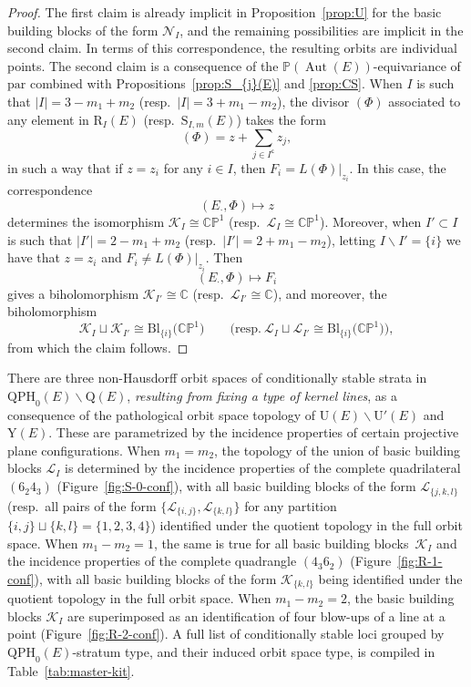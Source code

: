 \documentclass[10pt,a4paper]{amsart}
\newcommand{\field}[1]{\ensuremath{\mathbb{#1}}}
\newcommand{\CC}{\field{C}}
\newcommand{\PP}{\field{P}}
\newcommand{\curly}[1]{\mathscr{#1}}
\newcommand{\cK}{\curly{K}}
\newcommand{\cL}{\curly{L}}
\newcommand{\cN}{\curly{N}}
\newcommand{\qp}{\boldsymbol{\cdot}}
\DeclareMathOperator{\Aut}{Aut}
\numberwithin{equation}{section}
\begin{document}
\begin{proof}
The first claim is already implicit in Proposition~\ref{prop:U} for the basic building blocks of the form $\cN_{I}$, and the remaining possibilities are implicit in the second claim. In terms of this correspondence, the resulting orbits are individual points.
The second claim is a consequence of the $\PP(\Aut(E))$-equivariance of $\mathrm{par}$ combined with Propositions~\ref{prop:S_{j}(E)} and \ref{prop:CS}. When $I$ is such that $\vert I\vert = 3 - m_{1} + m_{2}$ (resp.~$\vert I\vert = 3 + m_{1} - m_{2}$), the divisor $(\Phi)$ associated to any element in $\mathrm{R}_{I}(E)$ (resp.~$\mathrm{S}_{I,m}(E)$) takes the form
\[
(\Phi) = z+ \sum_{j\in I^{\mathsf{c}}} z_{j},
\]
in such a way that if $z=z_{i}$ for any $i\in I$, then $F_{i} = L(\Phi)\vert_{z_{i}}$. In this case, the correspondence
\[
(E_{\qp},\Phi)\mapsto z
\]
determines the isomorphism $\cK_{I}\cong\CC\PP^{1}$ (resp.~$\cL_{I}\cong \CC\PP^{1}$). Moreover, when $I'\subset I$ is such that $\vert I'\vert = 2 - m_{1} + m_{2}$ (resp.~$\vert I'\vert = 2 + m_{1} - m_{2}$), letting $I\backslash I' = \{i\}$ we have that $z =z_{i}$ and $F_{i} \neq L(\Phi)\vert_{z_{i}}$. Then
\[
(E_{\qp},\Phi)\mapsto F_{i}
\]
gives a biholomorphism $\cK_{I'}\cong\CC$ (resp.~$\cL_{I'}\cong \CC$), and moreover, the biholomorphism
\[
\cK_{I}\sqcup\cK_{I'}\cong\mathrm{Bl}_{\{i\}}\big(\CC\PP^{1}\big)\qquad \big(\text{resp.}\ \cL_{I}\sqcup\cL_{I'}\cong\mathrm{Bl}_{\{i\}}\big(\CC\PP^{1}\big)\big),
\]
from which the claim follows.
\end{proof}

There are three non-Hausdorff orbit spaces of conditionally stable strata in $\mathrm{QPH}_{0}(E)\backslash\mathrm{Q}(E)$, \textit{resulting from fixing a type of kernel lines}, as a consequence of the pathological orbit space topology of $\mathrm{U}(E)\backslash\mathrm{U}'(E)$ and $\mathrm{Y}(E)$. These are parametrized by the incidence properties of certain projective plane configurations.
When $m_{1} = m_{2}$, the topology of the union of basic building blocks $\cL_{I}$ is determined by the incidence properties of the complete quadrilateral $(6_{2}4_{3})$ (Figure~\ref{fig:S-0-conf}), with all basic building blocks of the form $\cL_{\{j,k,l\}}$ (resp.~all pairs of the form $\{\cL_{\{i,j\}},\cL_{\{k,l\}}\}$ for any partition $\{i,j\}\sqcup\{k,l\} = \{1,2,3,4\}$) identified under the quotient topology in the full orbit space. When $m_{1} - m_{2} = 1$, the same is true for all basic building blocks~$\cK_{I}$ and the incidence properties of the complete quadrangle $(4_{3}6_{2})$ (Figure~\ref{fig:R-1-conf}), with all basic building blocks of the form $\cK_{\{k,l\}}$ being identified under the quotient topology in the full orbit space. When $m_{1} - m_{2} = 2$, the basic building blocks $\cK_{I}$ are superimposed as an identification of four blow-ups of a line at a point (Figure~\ref{fig:R-2-conf}). A full list of conditionally stable loci grouped by $\mathrm{QPH}_{0}(E)$-stratum type, and their induced orbit space type, is compiled in
Table~\ref{tab:master-kit}.
\end{document}
